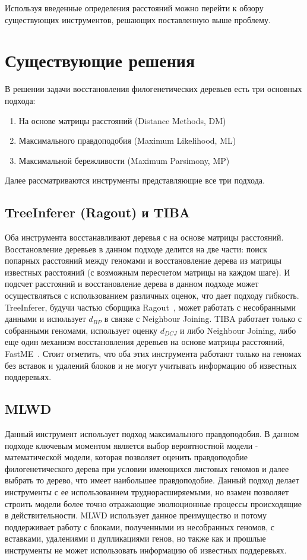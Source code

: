 Используя введенные определения расстояний можно перейти к обзору существующих инструментов,
решающих поставленную выше проблему.

\section{Существующие решения}

В решении задачи восстановления филогенетических деревьев есть три основных подхода:
\begin{enumerate}
  \item На основе матрицы расстояний (Distance Methods, DM)
  \item Максимального правдоподобия (Maximum Likelihood, ML)
  \item Максимальной бережливости (Maximum Parsimony, MP)
\end{enumerate}

Далее рассматриваются инструменты представляющие все три подхода.

\subsection{TreeInferer (Ragout) и TIBA}
Оба инструмента восстанавливают деревья с на основе матрицы расстояний.
Восстановление деревьев в данном подходе делится на две части:
поиск попарных расстояний между геномами и восстановление дерева из матрицы известных расстояний
(с возможным пересчетом матрицы на каждом шаге).
И подсчет расстояний и восстановление дерева в данном подходе может осуществляться с использованием различных оценок, что дает подходу гибкость.
TreeInferer, будучи частью сборщика Ragout~\cite{Kolmogorov2014}, может работать с несобранными данными
и использует $d_{BP}$ в связке с Neighbour Joining\cite{saitou1987neighbor}.
TIBA работает только с собранными геномами, использует оценку $d_{DCJ}$
и либо Neighbour Joining, либо еще один механизм восстановления деревьев на основе матрицы расстояний, FastME~\cite{desper2002fast}.
Стоит отметить, что оба этих инструмента работают только на геномах без вставок и удалений блоков
и не могут учитывать информацию об известных поддеревьях.

\subsection{MLWD}
Данный инструмент использует подход максимального правдоподобия.
В данном подходе ключевым моментом является выбор вероятностной модели - математической модели,
которая позволяет оценить правдоподобие филогенетического дерева при условии имеющихся листовых геномов
и далее выбрать то дерево, что имеет наибольшее правдоподобие.
Данный подход делает инструменты с ее использованием труднорасширяемыми,
но взамен позволяет строить модели более точно отражающие эволюционные процессы происходящие в действительности.
MLWD использует данное преимущество и потому поддерживает работу с блоками, полученными из несобранных геномов,
с вставками, удалениями и дупликациями генов, но также как
и прошлые инструменты не может использовать информацию об известных поддеревьях.

